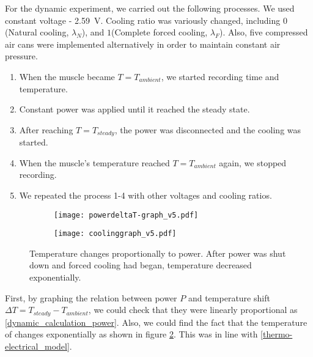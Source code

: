 For the dynamic experiment, we carried out the following processes. We used constant voltage - \SI{2.59}{\volt}. Cooling ratio was variously changed, including $0$(Natural cooling, $\lambda_{N}$), and $1$(Complete forced cooling, $\lambda_{F}$). Also, five compressed air cans were implemented alternatively in order to maintain constant air pressure. 
\begin{enumerate}
	\item When the muscle became $T=T_{ambient}$, we started recording time and temperature.
	\item Constant power was applied until it reached the steady state.
	\item After reaching $T=T_{steady}$, the power was disconnected and the cooling was started. 
	\item When the muscle's temperature reached $T=T_{ambient}$ again, we stopped recording. 
	\item We repeated the process 1-4 with other voltages and cooling ratios.
\end{enumerate}


\begin{figure}[t]
	\centering
	\begin{subfigure}[t]{0.45\linewidth}
		\centering\texttt{[image: powerdeltaT-graph\_v5.pdf]}
		\caption{\label{powerdeltaT}}
	\end{subfigure}%
	\begin{subfigure}[t]{0.45\linewidth}
		\centering\texttt{[image: coolinggraph\_v5.pdf]}
		\caption{\label{coolinggraph}}
	\end{subfigure}
	\caption[Results of the dynamic experiment]{ Temperature changes proportionally to power.  After power was shut down and forced cooling had began, temperature decreased exponentially.}
	\label{result_dynamic}
\end{figure}

First, by graphing the relation between power $P$ and temperature shift $\Delta{T}=T_{steady}-T_{ambient}$, we could check that they were linearly proportional as \eqref{dynamic_calculation_power}.
Also, we could find the fact that the temperature of \scp changes exponentially as shown in figure \ref{coolinggraph}. This was in line with  \eqref{thermo-electrical_model}.

